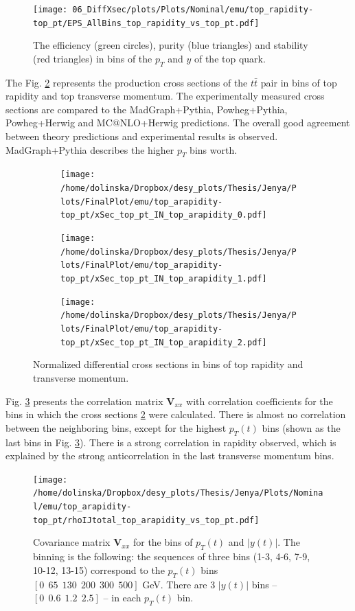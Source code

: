 \begin{figure}[t]
  \centering
  \texttt{[image: 06\_DiffXsec/plots/Plots/Nominal/emu/top\_rapidity-top\_pt/EPS\_AllBins\_top\_rapidity\_vs\_top\_pt.pdf]}
  \caption{The efficiency (green circles), purity (blue triangles) and stability (red triangles) in bins of the $p_{T}$ and $y$ of the top quark.}
  \label{fig:EPS_2D_y_pt}
\end{figure}

The Fig. \ref{fig:XS_2D_y_pt} represents the production cross sections of the $t\bar{t}$ pair in bins of top rapidity and top transverse momentum.
The experimentally measured cross sections are compared to the MadGraph+Pythia, Powheg+Pythia, Powheg+Herwig and MC@NLO+Herwig predictions.
The overall good agreement between theory predictions and experimental results is observed. MadGraph+Pythia describes the higher $p_{T}$ bins
worth.

\begin{figure}[p]
\centering
\begin{subfigure}
  \centering
  \texttt{[image: /home/dolinska/Dropbox/desy\_plots/Thesis/Jenya/Plots/FinalPlot/emu/top\_arapidity-top\_pt/xSec\_top\_pt\_IN\_top\_arapidity\_0.pdf]}
\end{subfigure}
\begin{subfigure}
  \centering
  \texttt{[image: /home/dolinska/Dropbox/desy\_plots/Thesis/Jenya/Plots/FinalPlot/emu/top\_arapidity-top\_pt/xSec\_top\_pt\_IN\_top\_arapidity\_1.pdf]}
\end{subfigure}
\begin{subfigure}
  \centering
  \texttt{[image: /home/dolinska/Dropbox/desy\_plots/Thesis/Jenya/Plots/FinalPlot/emu/top\_arapidity-top\_pt/xSec\_top\_pt\_IN\_top\_arapidity\_2.pdf]}
\end{subfigure}
\caption{Normalized differential cross sections in bins of top rapidity and transverse momentum.}
\label{fig:XS_2D_y_pt}
\end{figure}

Fig. \ref{fig:corr_matr} presents the correlation matrix $\mathbf{V}_{xx}$ with correlation coefficients for the bins in which the 
cross sections \ref{fig:XS_2D_y_pt} were calculated. There is almost no correlation between the neighboring bins, except for the highest $p_{T}(t)$
bins (shown as the last bins in Fig. \ref{fig:corr_matr}). There is a strong correlation in rapidity observed, which is explained by the strong 
anticorrelation in the last transverse momentum bins.

\begin{figure}[p]
  \centering
  \texttt{[image: /home/dolinska/Dropbox/desy\_plots/Thesis/Jenya/Plots/Nominal/emu/top\_arapidity-top\_pt/rhoIJtotal\_top\_arapidity\_vs\_top\_pt.pdf]}
  \caption{Covariance matrix $\mathbf{V}_{xx}$ for the bins of $p_{T}(t)$ and $|y(t)|$. The binning is the following:
  the sequences of three bins (1-3, 4-6, 7-9, 10-12, 13-15) correspond to the $p_{T}(t)$ bins $[0\:\:65\:\:130\:\:200\:\:300\:\:500]$ GeV.
          There are 3 $|y(t)|$ bins -- $[0\:\:0.6\:\:1.2\:\:2.5]$ -- in each $p_{T}(t)$ bin.}
  \label{fig:corr_matr}
\end{figure}